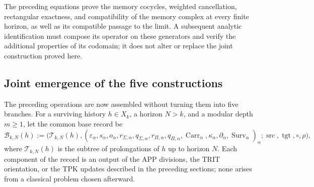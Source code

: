 The preceding equations prove the memory cocycles, weighted cancellation,
rectangular exactness, and compatibility of the memory complex at every
finite horizon, as well as its compatible passage to the limit.
A subsequent analytic identification must compose its operator on these
generators and verify the additional properties of its codomain; it does not
alter or replace the joint construction proved here.

\iffalse
\subsection{Joint emergence of the five constructions}
\label{sec:cinco-construcciones-continuo-ch}

The preceding operations are now assembled without turning them into five branches.
For a surviving history \(h\in X_k\), a horizon \(N>k\), and a
modular depth \(m\geq1\), let the common base record be
\[
 \mathcal B_{k,N}(h):=
 \bigl(\mathscr T_{k,N}(h),
       (\varepsilon_\alpha,s_\alpha,o_\alpha,
        r_{\Sigma,\alpha},q_{\Sigma,\alpha},
        r_{\Pi,\alpha},q_{\Pi,\alpha},
        \operatorname{Carr}_\alpha,
        \kappa_\alpha,\partial_\alpha,
        \operatorname{Surv}_\alpha)_\alpha;
       \operatorname{src},\operatorname{tgt},\circ,\rho\bigr),
 \tag{C1}
 \label{eq:base-comun-registros}
\]
where \(\mathscr T_{k,N}(h)\) is the subtree of prolongations of \(h\)
up to horizon \(N\). Each component of the record is an output of the
APP divisions, the TRIT orientation, or the TPK updates described
in the preceding sections; none arises from a classical problem chosen
afterward.


